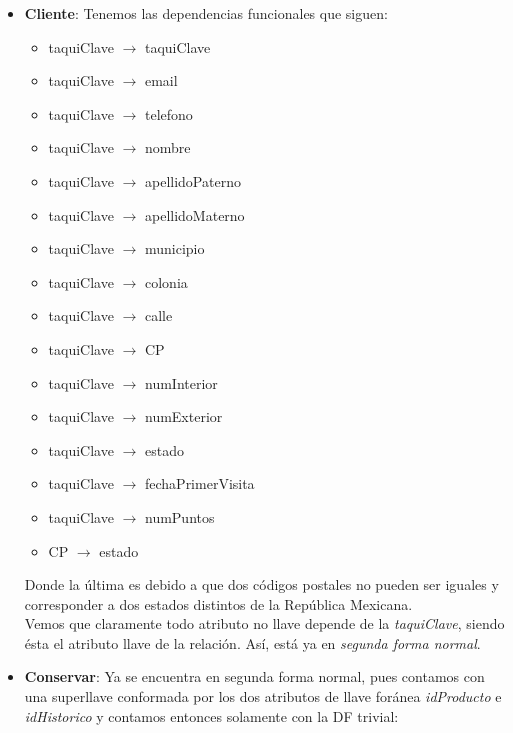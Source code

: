 \documentclass[11pt,letterpaper]{article}
\begin{document}
\begin{itemize}
\item \textbf{Cliente}: Tenemos las dependencias funcionales que siguen:

\begin{itemize}
\item taquiClave $\rightarrow$ taquiClave\\

\item taquiClave $\rightarrow$ email\\
\item taquiClave $\rightarrow$ telefono\\
\item taquiClave $\rightarrow$ nombre\\
\item taquiClave $\rightarrow$ apellidoPaterno\\
\item taquiClave $\rightarrow$ apellidoMaterno\\
\item taquiClave $\rightarrow$ municipio\\
\item taquiClave $\rightarrow$ colonia\\
\item taquiClave $\rightarrow$ calle\\
\item taquiClave $\rightarrow$ CP\\
\item taquiClave $\rightarrow$ numInterior\\
\item taquiClave $\rightarrow$ numExterior\\
\item taquiClave $\rightarrow$ estado\\
\item taquiClave $\rightarrow$ fechaPrimerVisita\\
\item taquiClave $\rightarrow$ numPuntos\\
\item CP $\rightarrow$ estado
\end{itemize}

Donde la última es debido a que dos códigos postales no pueden ser iguales y corresponder a dos estados distintos de la República Mexicana. \\

Vemos que claramente todo atributo no llave depende de la \textit{taquiClave}, siendo ésta el atributo llave de la relación. Así, está ya en \textit{segunda forma normal}.
\item \textbf{Conservar}: Ya se encuentra en segunda forma normal, pues contamos con una superllave conformada por los dos atributos de llave foránea \textit{idProducto} e \textit{idHistorico} y contamos entonces solamente con la DF trivial:


\end{itemize}
\end{document}

